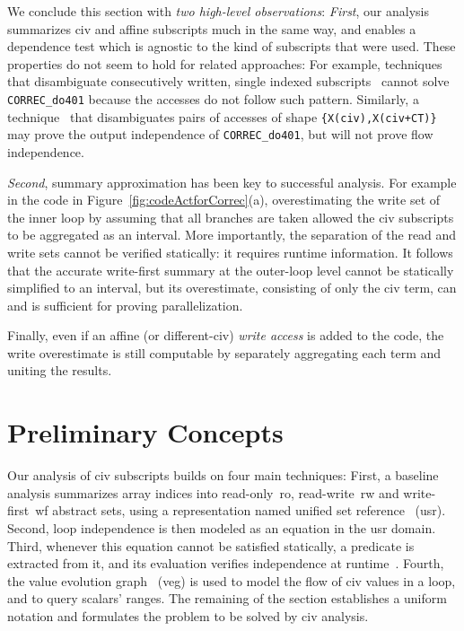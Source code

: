 \documentclass{sig-alternate}
\begin{document}
\vspace{1ex}
We conclude this section with {\em two high-level observations}: %
{\em First}, our analysis summarizes {\sc civ} and affine subscripts
much in the same way, and enables a dependence test which is agnostic
to the kind of subscripts that were used.
%
These properties do not seem to hold for related approaches: 
For example, techniques that disambiguate consecutively written,
single indexed subscripts~\cite{PaduaDemDrInterproc,VEG} cannot solve
{\tt CORREC\_do401} because the accesses do not follow such pattern.
Similarly, a technique~\cite{CohenBeyondMon} that disambiguates 
pairs of accesses of shape {\tt \{X(civ),X(civ+CT)\}} may prove the output 
independence of {\tt CORREC\_do401}, but will not prove flow independence. 
%


{\em Second}, summary approximation has been key to successful
analysis. For example in the code in Figure~\ref{fig:codeActforCorrec}(a), 
overestimating the write set of the inner loop by assuming that all 
branches are taken allowed the {\sc civ} subscripts to be aggregated
as an interval. 
More importantly, the separation of the read and write sets cannot 
be verified statically: it requires runtime information. 
%
It follows that the accurate write-first summary at the 
outer-loop level cannot be statically simplified to an interval,
but its overestimate, consisting of only the {\sc civ} term, 
can and is sufficient for proving parallelization.

Finally, even if an affine (or different-{\sc civ})
{\em write access} is added to the code, the write overestimate
is still computable by separately aggregating each term and 
uniting the results.


\section{Preliminary Concepts}
\label{subsec:Background}


Our analysis of {\sc civ} subscripts builds on four main techniques: 
%
First, a baseline analysis summarizes array indices into read-only~{\sc ro}, 
read-write~{\sc rw} and write-first~{\sc wf} abstract sets, using a 
representation named unified set reference~\cite{HybAn} ({\sc usr}).
%
Second, loop independence is then modeled as an equation in the 
{\sc usr} domain. 
%
Third, whenever this equation cannot be satisfied statically, a 
predicate is extracted from it, and its evaluation verifies independence 
at runtime~\cite{CosPLDI}. 
%
Fourth, the value evolution graph~\cite{VEG} ({\sc veg}) is 
used to model the flow of {\sc civ} values in a loop, and to 
query scalars' ranges.
The remaining of the section establishes a uniform notation and 
formulates the problem to be solved by {\sc civ} analysis. 
\end{document}
